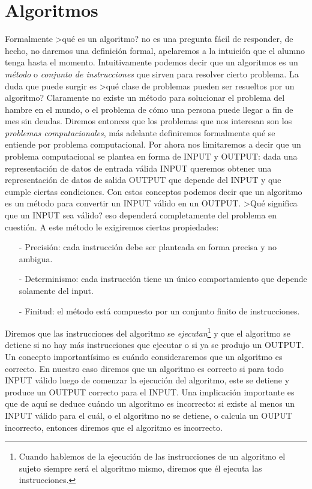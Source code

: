 \section{Algoritmos}

Formalmente >qué es un algoritmo? no es una pregunta fácil de responder, de hecho, no daremos una definición formal, apelaremos a la intuición que el alumno tenga hasta el momento.
Intuitivamente podemos decir que un algoritmos es un \emph{método} o \emph{conjunto de instrucciones} que sirven para resolver cierto problema.
La duda que puede surgir es >qué clase de problemas pueden ser resueltos por un algoritmo?
Claramente no existe un método para solucionar el problema del hambre en el mundo, o el problema de cómo una persona puede llegar a fin de mes sin deudas.
Diremos entonces que los problemas que nos interesan son los \emph{problemas computacionales}, más adelante definiremos formalmente qué se entiende por problema computacional.
Por ahora nos limitaremos a decir que un problema computacional se plantea en forma de INPUT y OUTPUT: dada una representación de datos de entrada válida INPUT queremos obtener una representación de datos de salida OUTPUT que depende del INPUT y que cumple ciertas condiciones.
Con estos conceptos podemos decir que un algoritmo es un método para convertir un INPUT válido en un OUTPUT.
>Qué significa que un INPUT sea válido? eso dependerá completamente del problema en cuestión.
A este método le exigiremos ciertas propiedades:
\begin{itemize}
  \itemsep 0pt
  \item[-] Precisión: cada instrucción debe ser planteada en forma precisa y no ambigua.
  \item[-] Determinismo: cada instrucción tiene un único comportamiento que depende solamente del input.
  \item[-] Finitud: el método está compuesto por un conjunto finito de instrucciones.
\end{itemize}

Diremos que las instrucciones del algoritmo se \emph{ejecutan}\footnote{Cuando hablemos de la ejecución de las instrucciones de un algoritmo el sujeto siempre será el algoritmo mismo, diremos que él ejecuta las instrucciones.} y que el algoritmo se detiene si no hay más instrucciones que ejecutar o si ya se produjo un OUTPUT.
Un concepto importantísimo es cuándo consideraremos que un algoritmo es correcto.
En nuestro caso diremos que un algoritmo es correcto si para todo INPUT válido luego de comenzar la ejecución del algoritmo, este se detiene y produce un OUTPUT correcto para el INPUT.
Una implicación importante es que de aquí se deduce cuándo un algoritmo es incorrecto: si existe al menos un INPUT válido para el cuál, o el algoritmo no se detiene, o calcula un OUPUT incorrecto, entonces diremos que el algoritmo es incorrecto.

